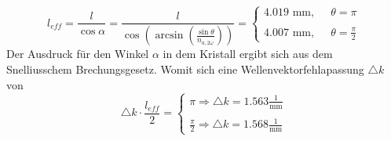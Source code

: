 \begin{equation}
l_{eff}=\frac{l}{\cos\alpha}=\frac{l}{\cos\left(\arcsin\left(\frac{\sin\theta}{n_{a,2\omega}}\right)\right)}=\left\{\begin{array}{ll} 4.019\text{ mm},  \;\; &\theta=\pi\\\\
4.007\text{ mm}, &\theta = \frac{\pi}{2}\end{array}\right.
\end{equation}
Der Ausdruck für den Winkel $\alpha$ in dem Kristall ergibt sich aus dem Snelliusschem Brechungsgesetz.\newline
Womit sich eine Wellenvektorfehlapassung $\triangle k$ von 
\begin{equation}
\triangle k\cdot \frac{l_{eff}}{2}=\left\{\begin{array}{ll} \pi \Longrightarrow \triangle k=1.563\frac{1}{\text{mm}} \\\\
\frac{\pi}{2}\Longrightarrow \triangle k=1.568\frac{1}{\text{mm}}  \end{array}\right.
\end{equation}
